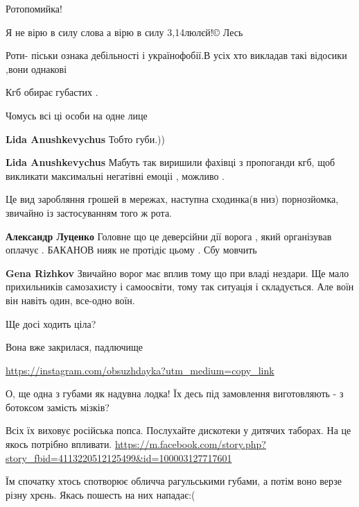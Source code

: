 \begin{itemize}
Ротопомийка!

Я не вірю в силу слова а вірю в силу 3,14люлєй!© Лесь

Роти- піськи ознака дебільності і українофобії.В усіх хто викладав такі відосики ,вони однакові

Кгб обирає губастих .

Чомусь всі ці особи на одне лице

\begin{itemize} %
\textbf{Lida Anushkevychus} Тобто губи.))

\textbf{Lida Anushkevychus} Мабуть так виришили фахівці з пропоганди кгб, щоб викликати максимальні негатівні емоціі , можливо .
\end{itemize} %

Це вид заробляння грошей в мережах, наступна сходинка(в низ)
порнозйомка, звичайно із застосуванням того ж рота.

\begin{itemize} %
\textbf{Александр Луценко} Головне що це деверсійни дії ворога , який організував оплачує . БАКАНОВ нияк не протідіє цьому . Сбу мовчить

\textbf{Gena Rizhkov} Звичайно ворог має вплив тому що при владі нездари. Ще
мало прихильників самозахисту і самоосвіти, тому так ситуація і складується. Але
воїн він навіть один, все-одно воїн.
\end{itemize} %

Ще досі ходить ціла?

Вона вже закрилася, падлючище

\url{https://instagram.com/obsuzhdayka?utm_medium=copy_link}

О, ще одна з губами як надувна лодка! Їх десь під замовлення виготовляють - з ботоксом замість мізків?


Всіх їх виховує російська попса. Послухайте дискотеки у дитячих таборах. На це якось потрібно впливати.
\url{https://m.facebook.com/story.php?story_fbid=4113220512125499&id=100003127717601}

Їм спочатку хтось спотворює обличча рагульськими губами, а потім воно верзе різну хрєнь. Якась пошесть на них нападає:(


\end{itemize}
